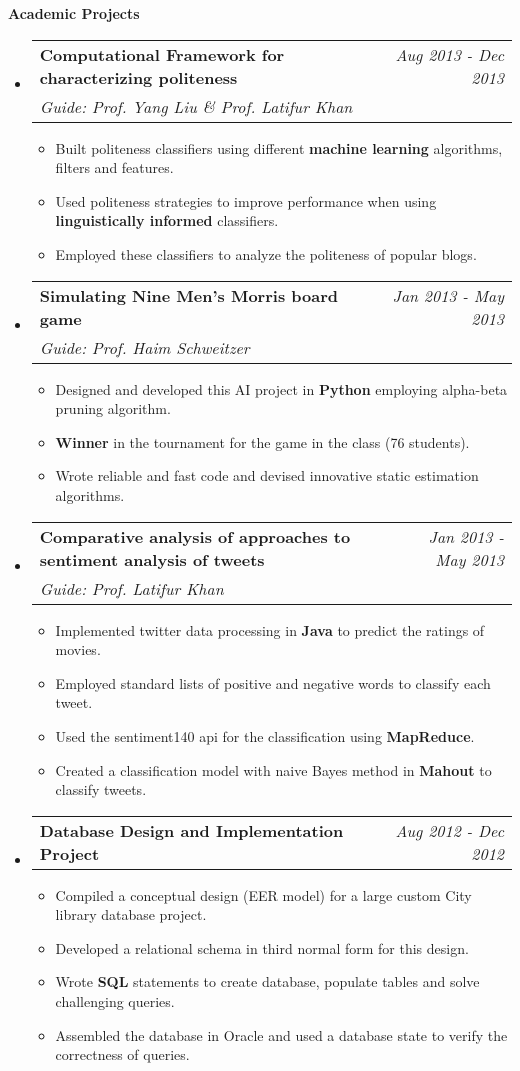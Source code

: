 \documentclass[letterpaper,11pt]{article}
\makeatletter
\newcommand{\resitem}[1]{\item[\ding{226}] #1 \vspace{-2pt}}
\newcommand{\resheading}[1]{{\large \colorbox{mygrey}{\begin{minipage}{\textwidth}{\textbf{#1 \vphantom{p\^{E}}}}\end{minipage}}}}
\newcommand{\ressubheading}[4]{
\begin{tabular*}{7.0in}{l@{\extracolsep{\fill}}r}
		\textbf{#1} & #2 \\
		\textit{#3} & \textit{#4} \\
\end{tabular*}\vspace{-6pt}}
\newcommand{\reslineheading}[2]{
\begin{tabular*}{7.0in}{l@{\extracolsep{\fill}}r}
		\textbf{#1} & #2 \\
\end{tabular*}\vspace{-6pt}}
\makeatother
\begin{document}
\resheading{Academic Projects}
\begin{itemize}

\item
	\ressubheading{Computational Framework for characterizing politeness}{\textit{Aug 2013 - Dec 2013}}{Guide: Prof. Yang Liu \& Prof. Latifur Khan}{}
	\begin{itemize}
		\resitem{Built politeness classifiers using different \textbf{machine learning} algorithms, filters and features.}
        \resitem{Used politeness strategies to improve performance when using \textbf{linguistically informed} classifiers.}
        \resitem{Employed these classifiers to analyze the politeness of popular blogs.}
	\end{itemize}

\item
	\ressubheading{Simulating Nine Men's Morris board game}{\textit{Jan 2013 - May 2013}}{Guide: Prof. Haim Schweitzer}{}
	\begin{itemize}
		\resitem{Designed and developed this AI project in \textbf{Python} employing alpha-beta pruning algorithm.}
		\resitem{\textbf{Winner} in the tournament for the game in the class (76 students).}
        \resitem{Wrote reliable and fast code and devised innovative static estimation algorithms.}
	\end{itemize}

\item
	\ressubheading{Comparative analysis of approaches to sentiment analysis of tweets}{\textit{Jan 2013 - May 2013}}{Guide: Prof. Latifur Khan}{}
	\begin{itemize}
		\resitem{Implemented twitter data processing in \textbf{Java} to predict the ratings of movies.}
		\resitem{Employed standard lists of positive and negative words to classify each tweet.}
		\resitem{Used the sentiment140 api for the classification using \textbf{MapReduce}.}
		\resitem{Created a classification model with naive Bayes method in \textbf{Mahout} to classify tweets.}
	\end{itemize}

\item
	\reslineheading{Database Design and Implementation Project}{\textit{Aug 2012 - Dec 2012}}
	\begin{itemize}
		\resitem{Compiled a conceptual design (EER model) for a large custom City library database project.}
		\resitem{Developed a relational schema in third normal form for this design.}
        \resitem{Wrote \textbf{SQL} statements to create database, populate tables and solve challenging queries.}
		\resitem{Assembled the database in Oracle and used a database state to verify the correctness of queries.}
	\end{itemize}


\end{itemize}
\end{document}
